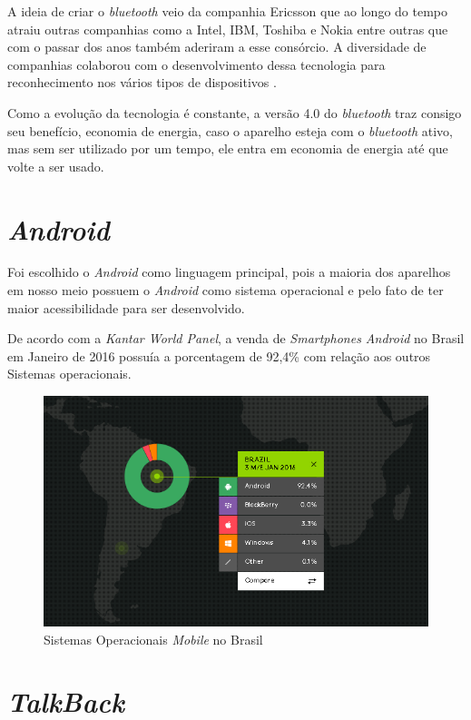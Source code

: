 A ideia de criar o \textit{bluetooth} veio da companhia Ericsson que ao longo do tempo atraiu outras companhias como a Intel, IBM, Toshiba e Nokia entre outras que com o passar dos anos também aderiram a esse consórcio. A diversidade de companhias colaborou com o desenvolvimento dessa tecnologia para reconhecimento nos vários tipos de dispositivos \cite{alecrim}.

Como a evolução da tecnologia é constante, a versão 4.0 do \textit{bluetooth} traz consigo seu benefício, economia de energia, caso o aparelho esteja com o \textit{bluetooth} ativo, mas sem ser utilizado por um tempo, ele entra em economia de energia até que volte a ser usado. 

\section{\textit{Android}}
Foi escolhido o \textit{Android} como linguagem principal, pois a maioria dos aparelhos em nosso meio possuem o \textit{Android} como sistema operacional e pelo fato de ter maior acessibilidade para ser desenvolvido.

De acordo com a \textit{Kantar World Panel}, a venda de \textit{Smartphones Android} no Brasil em Janeiro de 2016 possuía a porcentagem de 92,4\% com relação aos outros Sistemas operacionais. \cite{kantar}

\begin{figure}[H]
  \centering
  \includegraphics[width=13cm]{./figs/porcentagem_android.png}
  \caption{Sistemas Operacionais \textit{Mobile} no Brasil}
  \par{}
\end{figure}

\section{\textit{TalkBack}}

